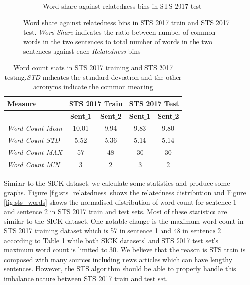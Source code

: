 \begin{enumerate}
\begin{figure}
\begin{subfigure}[b]{.5\textwidth}
		\caption{Word share against relatedness bins in STS 2017 test}
		\label{fig:sts_test_word_share}
	\end{subfigure}
	\caption[Word share against relatedness bins in STS 2017 train and STS 2017 test.]{Word share against relatedness bins in STS 2017 train and STS 2017 test. \textit{Word Share} indicates the ratio between number of common words in the two sentences to total number of words in the two sentences against each \textit{Relatedness} bins}
	\label{fig:sts_word_share}
\end{figure}


\begin{table}
	\centering
	\begin{tabular}{l|cc|cc}
		\hline
		Measure   & \multicolumn{2}{c|}{STS 2017 Train} & \multicolumn{2}{c}{STS 2017 Test} \\
		\hline
		\multicolumn{1}{l|}{} & \textbf{Sent$\_$1} & \textbf{Sent$\_$2} & \textbf{Sent$\_$1} & \textbf{Sent$\_$2} \\
		\textit{Word Count Mean} & 10.01 & 9.94 & 9.83 & 9.80  \\
		\textit{Word Count STD} & 5.52 & 5.36 & 5.14 & 5.14  \\
		\textit{Word Count MAX} & 57 & 48 & 30 & 30  \\
		\textit{Word Count MIN} & 3 & 2 & 3 & 2  \\
		\hline
	\end{tabular}
	\caption[Word count stats in STS 2017]{Word count stats in STS 2017 training and STS 2017 testing.\textit{STD} indicates the standard deviation and the other acronyms indicate the common meaning }
	\label{table:sts_2017_sts}
\end{table}

Similar to the SICK dataset, we calculate some statistics and produce some graphs. Figure \ref{fig:sts_relatedness} shows the relatedness distribution and Figure \ref{fig:sts_words} shows the normalised distribution of word count for sentence 1 and sentence 2 in STS 2017 train and test sets. Most of these statistics are similar to the SICK dataset. One notable change is the maximum word count in STS 2017 training dataset which is 57 in sentence 1 and 48 in sentence 2 according to Table \ref{table:sts_2017_sts} while both SICK datasets' and STS 2017 test set's maximum word count is limited to 30. We believe that the reason is STS train is composed with many sources including news articles which can have lengthy sentences. However, the STS algorithm should be able to properly handle this imbalance nature between STS  
2017 train and test set. 


\end{enumerate}
